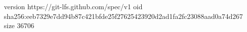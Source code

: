 version https://git-lfs.github.com/spec/v1
oid sha256:eeb7329e7dd94b87c421bfde25f27625423920d2ad1fa2fc23088aad0a74d267
size 36706
